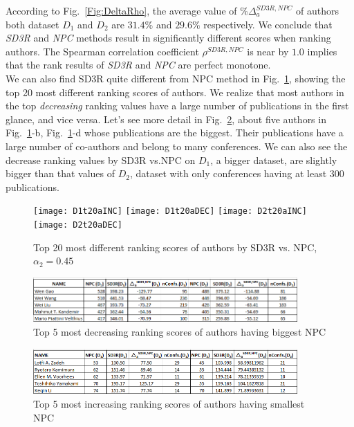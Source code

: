 \documentclass[10pt,leqno,twoside]{article}
\begin{document}
According to Fig.~\ref{Fig:DeltaRho}, the average value of $\%\Delta^{SD3R, NPC}_a$ of authors both dataset $D_1$ and $D_2$ are $31.4\%$ and $29.6\%$ respectively. We conclude that \textit{SD3R} and \textit{NPC} methods result in significantly different scores when ranking authors. The Spearman correlation coefficient $\rho^{SD3R,NPC}$ is near by $1.0$ implies that the rank results of \textit{SD3R} and \textit{NPC} are perfect monotone.
\\
We can also find SD3R quite different from NPC method in Fig.~\ref{Fig:Top20AuthorIncDec}, showing the top 20 most different ranking scores of authors. We realize that most authors in the top \textit{decreasing} ranking values have a large number of publications in the first glance, and vice versa. Let's see more detail in Fig.~\ref{Fig:Top5AuthorDec}, about five authors in Fig.~\ref{Fig:Top20AuthorIncDec}-b, Fig.~\ref{Fig:Top20AuthorIncDec}-d whose publications are the biggest. Their publications have a large number of co-authors and belong to many conferences. We can also see the decrease ranking values by SD3R vs.NPC on $D_1$, a bigger dataset, are slightly bigger than that values of $D_2$, dataset with only conferences having at least 300 publications.  
\\
\begin{figure} 
	\caption{Top 20 most different ranking scores of authors by SD3R vs. NPC, $\alpha_2=0.45$}
	\label{Fig:Top20AuthorIncDec}
    \centering
    \texttt{[image: D1t20aINC]}
    \texttt{[image: D1t20aDEC]}
    \texttt{[image: D2t20aINC]}
    \texttt{[image: D2t20aDEC]}
\end{figure}
%
%
\begin{figure} %
	\caption{Top 5 most decreasing ranking scores of authors having biggest NPC}
	\label{Fig:Top5AuthorDec}
    \centering
    \includegraphics[width=0.9\textwidth]{T5adec}
\end{figure}
%
%
\begin{figure} %
	\caption{Top 5 most increasing ranking scores of authors having smallest NPC}
	\label{Fig:Top5AuthorInc}
    \centering
    \includegraphics[width=0.9\textwidth]{T5ainc}
\end{figure}
\end{document}
